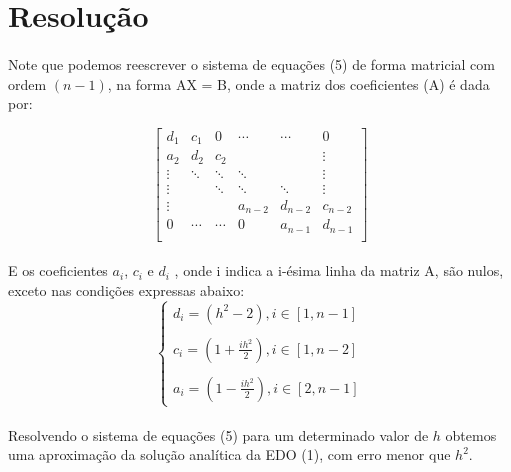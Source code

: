 \documentclass{coursepaper}
\begin{document}
        \section{Resolução}

        \paragraph{}
            Note que podemos reescrever o sistema de equações (5) de forma matricial com ordem $(n-1)$, na forma AX = B, onde a matriz dos coeficientes (A) é dada por:

            \begin{equation*}
			\begin{bmatrix}
				d_{1}  & c_{1}  & 0  & \cdots & \cdots & 0 \\
				a_{2}  & d_{2}  & c_{2}  && & \vdots \\
				\vdots & \ddots & \ddots & \ddots &  & \vdots \\
				\vdots & & \ddots & \ddots & \ddots& \vdots\\
				\vdots  & & & a_{n-2}  & d_{n-2}  &  c_{n-2}\\
				0 & \cdots & \cdots & 0 & a_{n-1} & d_{n-1}  \\
			\end{bmatrix}
			\end{equation*}

        \paragraph{}
            E os coeficientes $a_{i}$, $c_{i}$ e $d_{i}$ , onde i indica a i-ésima linha da matriz A, são nulos, exceto nas condições expressas abaixo:\\
            \begin{equation}
                \begin{cases}
                    d_{i} = (h^2-2), i \in [1,n-1]\\ \\
                    c_{i} = \left(1+\frac{ih^2}{2} \right), i\in[1,n-2]\\ \\
                    a_{i} = \left(1-\frac{ih^2}{2} \right), i\in[2,n-1]
                \end{cases}
            \end{equation}

        \paragraph{}
            Resolvendo o sistema de equações (5) para um determinado valor de $h$ obtemos uma aproximação da solução analítica da EDO (1), com erro menor que $h^2$.
\end{document}

